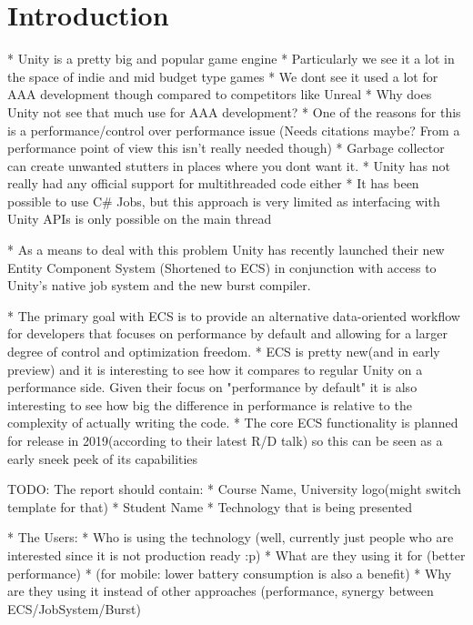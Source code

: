 \section{Introduction}
* Unity is a pretty big and popular game engine
* Particularly we see it a lot in the space of indie and mid budget type games
* We dont see it used a lot for AAA development though compared to competitors like Unreal 
* Why does Unity not see that much use for AAA development?
   * One of the reasons for this is a performance/control over performance issue (Needs citations maybe? From a performance point of view this isn't really needed though)
      * Garbage collector can create unwanted stutters in places where you dont want it.
      * Unity has not really had any official support for multithreaded code either
         * It has been possible to use C\# Jobs, but this approach is very limited as interfacing with Unity APIs is only possible on the main thread

* As a means to deal with this problem Unity has recently launched their new Entity Component System (Shortened to ECS) in conjunction with access to Unity's native job system and the new burst compiler. 
   
* The primary goal with ECS is to provide an alternative data-oriented workflow for developers that focuses on performance by default and allowing for a larger degree of control and optimization freedom.
* ECS is pretty new(and in early preview) and it is interesting to see how it compares to regular Unity on a performance side. Given their focus on "performance by default" it is also interesting to see how big the difference in performance is relative to the complexity of actually writing the code.
* The core ECS functionality is planned for release in 2019(according to their latest R/D talk) so this can be seen as a early sneek peek of its capabilities

TODO: 
The report should contain:
* Course Name, University logo(might switch template for that)
* Student Name
* Technology that is being presented

* The Users:
  * Who is using the technology (well, currently just people who are interested since it is not production ready :p)
  * What are they using it for (better performance)
     * (for mobile: lower battery consumption is also a benefit)
  * Why are they using it instead of other approaches (performance, synergy between ECS/JobSystem/Burst)

